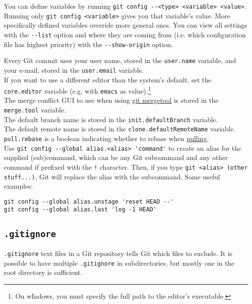 \documentclass[8pt, table, xcdraw]{article}%
\begin{document}
You can define variables by running \lstinline{git config --<type> <variable> <value>}. Running only \lstinline{git config <variable>} gives you that variable's value. More specifically defined variables override more general ones. You can view all settings with the \lstinline{--list} option and where they are coming from (i.e. which configuration file has highest priority) with the \lstinline{--show-origin} option.

Every Git commit uses your user name, stored in the \lstinline{user.name} variable, and your e-mail, stored in the \lstinline{user.email} variable.\\
If you want to use a different editor than the system's default, set the \lstinline{core.editor} variable (e.g. with \lstinline{emacs} as value).\footnote{On wIndows, you must specify the full path to the editor's executable.}\\
The merge conflict GUI to use when using \hyperref[mergetool]{git mergetool} is stored in the \lstinline{merge.tool} variable.\\
The default branch name is stored in the \lstinline{init.defaultBranch} variable.\\
The default remote name is stored in the \lstinline{clone.defaultRemoteName} variable.\\
\lstinline{pull.rebase} is a boolean indicating whether to rebase when \hyperref[pull]{pulling}.\\
Use \lstinline{git config --global alias.<alias> 'command'} to create an alias for the supplied (sub)command, which can be any Git subcommand and any other command if prefixed with the \lstinline{!} character. Then, if you type \lstinline{git <alias> (other stuff...)}, Git will replace the alias with the subcommand. Some useful examples:

\begin{lstlisting}
git config --global alias.unstage 'reset HEAD --'
git config --global alias.last 'log -1 HEAD'
\end{lstlisting}

\subsection{\lstinline{.gitignore}} \label{gitignore}

\lstinline{.gitignore} text files in a Git repository tells Git which files to exclude. It is possible to have multiple \lstinline{.gitignore} in subdirectories, but mostly one in the root directory is sufficient.
\end{document}
